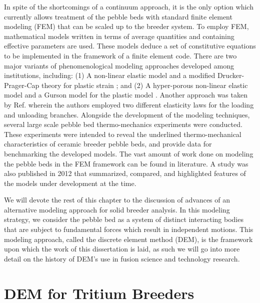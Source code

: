 In spite of the shortcomings of a continuum approach, it is the only option which currently allows treatment of the pebble beds with standard finite element modeling (FEM) that can be scaled up to the breeder system. To employ FEM, mathematical models written in terms of average quantities and containing effective parameters are used. These models deduce a set of constitutive equations to be implemented in the framework of a finite element code.  There are two major variants of phenomenological modeling approaches developed among institutions, including: (1) A non-linear elastic model and a modified Drucker-Prager-Cap theory for plastic strain \cite{Gan2007189,fokkens2003}; and (2) A hyper-porous non-linear elastic model and a Gurson model for the plastic model \cite{DellOrco:2007hc,DellOrco:2010zr,DiMaio20081287}. Another approach was taken by Ref.\cite{fokkens2003} wherein the authors employed two different elasticity laws for the loading and unloading branches. Alongside the development of the modeling techniques, several large scale pebble bed thermo-mechanics experiments were conducted. These experiments were intended to reveal the underlined thermo-mechanical characteristics of ceramic breeder pebble beds, and provide data for benchmarking the developed models. The vast amount of work done on modeling the pebble beds in the FEM framework can be found in literature. \cite{DellOrco:2007hc,DellOrco:2010zr,DiMaio20101234,Gan2007189,Gan2007189,Gan:2009vn,Gan:2010lh,Gan:2010kc,DellOrco:2007hc,DellOrco:2010zr,DiMaio20101234,Gan2007189,DellOrco:2007hc,DiMaio20101234} A study was also published in 2012 that summarized, compared, and highlighted features of the models under development at the time.\cite{ying2011isfnt}

We will devote the rest of this chapter to the discussion of advances of an alternative modeling approach for solid breeder analysis. In this modeling strategy, we consider the pebble bed as a system of distinct interacting bodies that are subject to fundamental forces which result in independent motions. This modeling approach, called the discrete element method (DEM), is the framework upon which the work of this dissertation is laid, as such we will go into more detail on the history of DEM's use in fusion science and technology research.

\section{DEM for Tritium Breeders}

